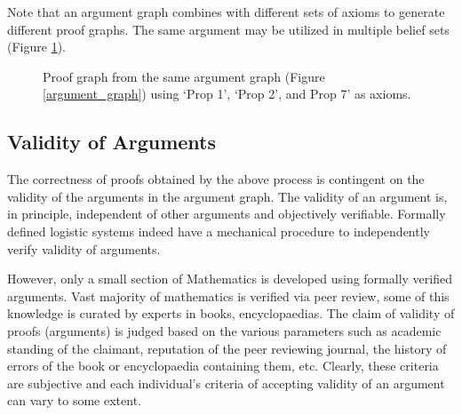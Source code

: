 \documentclass[a4paper]{article}
\begin{document}
Note that an argument graph combines with different sets of axioms to generate different proof graphs. The same argument may be utilized in multiple belief sets (Figure \ref{proof_graph2}).

\begin{figure}[htbp]
\begin{center}
\caption{Proof graph from the same argument graph (Figure \ref{argument_graph}) using `Prop 1', `Prop 2', and Prop 7' as axioms.}
\label{proof_graph2}
\end{center}
\end{figure}

\subsection{Validity of Arguments}

The correctness of proofs obtained by the above process is contingent on the validity of the arguments in the argument graph. The validity of an argument is, in principle, independent of other arguments and objectively verifiable. Formally defined logistic systems indeed have a mechanical procedure to independently verify validity of arguments.

However, only a small section of Mathematics is developed using formally verified arguments. Vast majority of mathematics is verified via peer review, some of this knowledge is curated by experts in books, encyclopaedias. The claim of validity of proofs (arguments) is judged based on the various parameters such as academic standing of the claimant, reputation of the peer reviewing journal, the history of errors of the book or encyclopaedia containing them, etc. Clearly, these criteria are subjective and each individual's criteria of accepting validity of an argument can vary to some extent.
\end{document}
